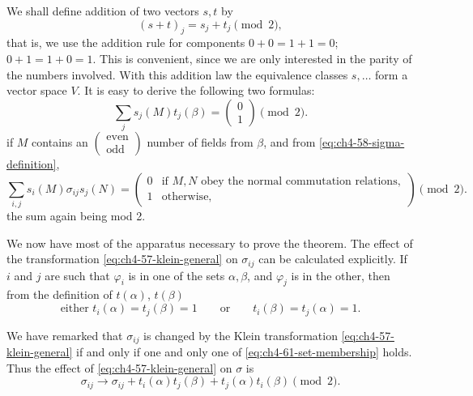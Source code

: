 We shall define addition of two vectors $s,t$ by
\begin{equation*}
  (s+t)_j=s_j+t_j\pmod 2,
\end{equation*}
that is, we use the addition rule for components $0+0=1+1=0$;
$0+1=1+0=1$.  This is convenient, since we are only interested in the parity
of the numbers involved.  With this addition law the equivalence classes
$s,\ldots$ form a vector space $V$.  It is easy to derive the following two
formulas:
\begin{equation}
  \sum_j s_j(M)t_j(\beta)=
  \left(\begin{smallmatrix}0\\1\end{smallmatrix}\right)\pmod 2.
  \tag{4-59}\label{eq:ch4-59-parity-sum}
\end{equation}
if $M$ contains an $\left(\begin{smallmatrix}\text{even}\\\text{odd}\end{smallmatrix}\right)$
number of fields from $\beta$, and from \eqref{eq:ch4-58-sigma-definition},
\begin{equation}
  \sum_{i,j}s_i(M)\sigma_{ij}s_j(N)=
  \left(\begin{array}{ll}
    0&\text{if $M,N$ obey the normal commutation relations},\\
    1&\text{otherwise,}
  \end{array}\right)\pmod 2.
  \tag{4-60}\label{eq:ch4-60-normal-monomial-pairing}
\end{equation}
the sum again being mod 2.

We now have most of the apparatus necessary to prove the theorem.  The effect
of the transformation \eqref{eq:ch4-57-klein-general} on $\sigma_{ij}$ can be calculated explicitly.
If $i$ and $j$ are such that $\varphi_i$ is in one of the sets $\alpha,\beta$,
and $\varphi_j$ is in the other, then from the definition of $t(\alpha)$,
$t(\beta)$
\begin{equation}
  \text{either }t_i(\alpha)=t_j(\beta)=1
  \qquad\text{or}\qquad t_i(\beta)=t_j(\alpha)=1.
  \tag{4-61}\label{eq:ch4-61-set-membership}
\end{equation}

We have remarked that $\sigma_{ij}$ is changed by the Klein transformation
\eqref{eq:ch4-57-klein-general} if and only if one and only one of \eqref{eq:ch4-61-set-membership} holds.  Thus the effect of
\eqref{eq:ch4-57-klein-general} on $\sigma$ is
\begin{equation}
  \sigma_{ij}\longrightarrow\sigma_{ij}
  +t_i(\alpha)t_j(\beta)+t_j(\alpha)t_i(\beta)\pmod 2.
  \tag{4-62}\label{eq:ch4-62-sigma-update}
\end{equation}

